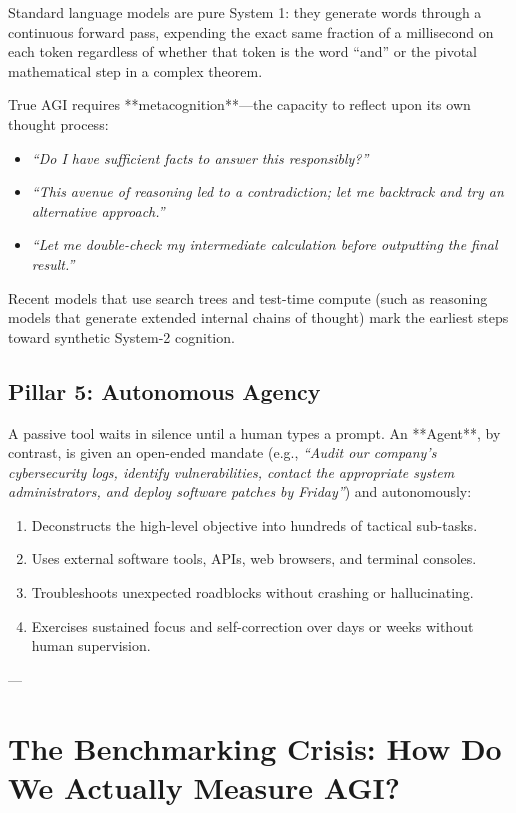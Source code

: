 \documentclass[11pt,journal,onecolumn]{IEEEtran}
\begin{document}
Standard language models are pure System 1: they generate words through a continuous forward pass, expending the exact same fraction of a millisecond on each token regardless of whether that token is the word ``and'' or the pivotal mathematical step in a complex theorem.

True AGI requires **metacognition**---the capacity to reflect upon its own thought process:
\begin{itemize}
    \item \textit{``Do I have sufficient facts to answer this responsibly?''}
    \item \textit{``This avenue of reasoning led to a contradiction; let me backtrack and try an alternative approach.''}
    \item \textit{``Let me double-check my intermediate calculation before outputting the final result.''}
\end{itemize}
Recent models that use search trees and test-time compute (such as reasoning models that generate extended internal chains of thought) mark the earliest steps toward synthetic System-2 cognition.

\subsection{Pillar 5: Autonomous Agency}
A passive tool waits in silence until a human types a prompt. An **Agent**, by contrast, is given an open-ended mandate (e.g., \textit{``Audit our company's cybersecurity logs, identify vulnerabilities, contact the appropriate system administrators, and deploy software patches by Friday''}) and autonomously:
\begin{enumerate}
    \item Deconstructs the high-level objective into hundreds of tactical sub-tasks.
    \item Uses external software tools, APIs, web browsers, and terminal consoles.
    \item Troubleshoots unexpected roadblocks without crashing or hallucinating.
    \item Exercises sustained focus and self-correction over days or weeks without human supervision.
\end{enumerate}

---

\section{The Benchmarking Crisis: How Do We Actually Measure AGI?}
\label{sec:benchmarks}
\end{document}
